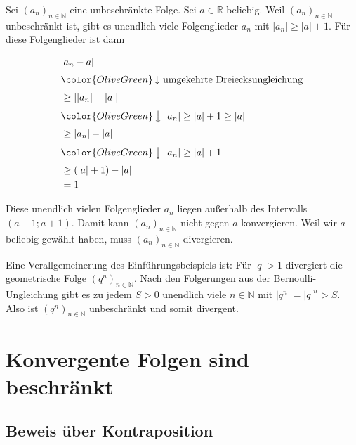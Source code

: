 \documentclass[fontsize=9pt,
               parskip=half-,
               DIV=14,
               listof=chapterentry,
               tocflat]{scrbook}
\begin{document}
\begin{proof*}
Sei $(a_{n})_{n\in \mathbb {N} }$ eine unbeschränkte Folge. Sei $a\in \mathbb {R} $ beliebig. Weil $(a_{n})_{n\in \mathbb {N} }$ unbeschränkt ist, gibt es unendlich viele Folgenglieder $a_{n}$ mit $|a_{n}|\geq |a|+1$. Für diese Folgenglieder ist dann

\begin{align*}
&|a_{n}-a|\\[0.3em]&{\color {OliveGreen}\left\downarrow \ {\text{umgekehrte Dreiecksungleichung}}\right.}\\[0.3em]&\geq ||a_{n}|-|a||\\[0.3em]&{\color {OliveGreen}\left\downarrow \ |a_{n}|\geq |a|+1\geq |a|\right.}\\[0.3em]&\geq |a_{n}|-|a|\\[0.3em]&{\color {OliveGreen}\left\downarrow \ |a_{n}|\geq |a|+1\right.}\\[0.3em]&\geq (|a|+1)-|a|\\&=1
\end{align*}

Diese unendlich vielen Folgenglieder $a_{n}$ liegen außerhalb des Intervalls $(a-1;a+1)$. Damit kann $(a_{n})_{n\in \mathbb {N} }$ nicht gegen $a$ konvergieren. Weil wir $a$ beliebig gewählt haben, muss $(a_{n})_{n\in \mathbb {N} }$ divergieren.

\end{proof*}

\begin{example*}
Eine Verallgemeinerung des Einführungsbeispiels ist: Für $|q|>1$ divergiert die geometrische Folge $\left(q^{n}\right)_{n\in \mathbb {N} }$. Nach den \href{https://de.wikibooks.org/wiki/Mathe\_für\_Nicht-Freaks:\_Bernoulli-Ungleichung\#Anker:Folgerung}
{Folgerungen aus der Bernoulli-Ungleichung} gibt es zu jedem $S>0$ unendlich viele $n\in \mathbb {N} $ mit $|q^{n}|=|q|^{n}>S$. Also ist $\left(q^{n}\right)_{n\in \mathbb {N} }$ unbeschränkt und somit divergent.

\end{example*}

\section{Konvergente Folgen sind beschränkt}

\subsection{Beweis über Kontraposition}
\end{document}

